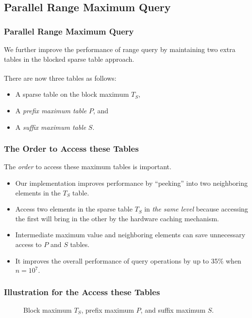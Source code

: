 \subsection{Parallel Range Maximum Query}
\begin{frame}
    \frametitle{Parallel Range Maximum Query}
    We further improve the performance of range query by maintaining two
	extra tables in the blocked sparse table approach.  
	\\~\\
	There are now three tables as follows:

	\begin{itemize}
		\setlength\itemsep{1em}
		\item
			A sparse table on the block maximum $T_S$, 
		\item
			A {\em prefix maximum table} $P$, and 
		\item
			A {\em suffix maximum table} $S$.
	\end{itemize}
\end{frame}

\begin{frame}
	\frametitle{The Order to Access these Tables}
	The {\em order} to access these maximum tables is important.
	\begin{itemize}
		\setlength\itemsep{1em}
		\item
			Our implementation improves performance by ``peeking'' into
			two neighboring elements in the $T_{S}$ table.
		\item 
			Access two elements in the sparse table $T_S$ in {\em the
  			same level} because accessing the first will bring in the
  			other by the hardware caching mechanism.
  		\item
  			Intermediate maximum value and neighboring elements can save
			unnecessary access to $P$ and $S$ tables.
		\item
			It improves the overall performance of query operations by
			up to 35\% when $n = 10^7$.
	\end{itemize}
\end{frame}

\begin{withoutheadline}
\begin{frame}
	\frametitle{Illustration for the Access these Tables}
	\begin{center}
	\scalebox{0.7} { \begin{minipage}{1.5\textwidth}
				\begin{figure}[!thb]
				  \centering {}  \caption{Block maximum $T_S$, prefix maximum $P$, and suffix
				    maximum $S$.}
				  \label{fig:compressed-sp-opt}
				\end{figure}
				\end{minipage}
		}
	\end{center}
\end{frame}
\end{withoutheadline}

